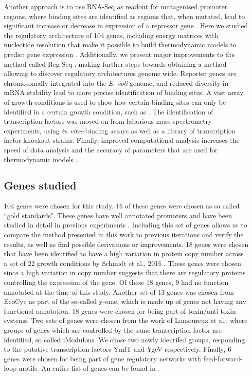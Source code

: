 Another approach is to use RNA-Seq as readout for mutagenised promoter regions, where binding sites are identified as regions that, when mutated, lead to significant increase or decrease in expression of a repressor gene \cite{urtecho2018systematic, urtecho2020genome, ireland2020deciphering}. Here we studied the regulatory architecture of 104 genes, including energy matrices with nucleotide resolution that make it possible to build thermodynamic models to predict gene expression \cite{kinney2010using,belliveau2018systematic,barnes2019mapping,ireland2020deciphering}. Additionally, we present major improvements to the method called Reg-Seq \cite{ireland2020deciphering}, making further steps towards obtaining a method allowing to discover regulatory architectures genome wide. Reporter genes are chromosomally integrated into the \textit{E. coli} genome, and reduced diversity in mRNA stability lead to more precise identification of binding sites. A vast array of growth conditions is used to show how certain binding sites can only be identified in a certain growth condition, such as . The identification of transcription factors was moved on from laborious mass spectrometry experiments, using \textit{in vitro} binding assays as well as a library of transcription factor knockout strains. Finally, improved computational analysis increases the speed of data analysis and the accuracy of parameters that are used for thermodynamic models .



\subsection{Genes studied}
104 genes were chosen for this study. 16 of these genes were chosen as so called ``gold standards". These genes have well annotated promoters and have been studied in detail in previous experiments \cite{belliveau2018systematic,ireland2020deciphering}. Including this set of genes allows us to compare the method presented in this work to previous iterations and verify the results, as well as find possible derivations or improvements. 18 genes were chosen that have been identified to have a high variation in protein copy number across a set of 22 growth conditions by Schmidt et al., 2016 \cite{schmidt2016quantitative}. These genes were chosen since a high variation in copy number suggests that there are regulatory proteins controlling the expression of the gene. Of these 18 genes, 9 had no function annotated at the time of this study. Another set of 13 genes was chosen from EcoCyc as part of the so-called y-ome\cite{ghatak2019ome}, which is made up of genes not having any functional annotation. 18 genes were chosen for being part of toxin/anti-toxin systems. Two sets of genes were chosen from the work of Lamoureux et al.\cite{lamoureux2021precise}, where groups of genes which are controlled by the same transcription factor are identified, so called iModulons. We chose two newly identifed groups, responding to the putative transcription factors YmfT and YgeV respectively. Finally, 6 genes were chosen for being part of gene regulatory networks with feed-forward-loop motifs. An entire list of genes can be found in .